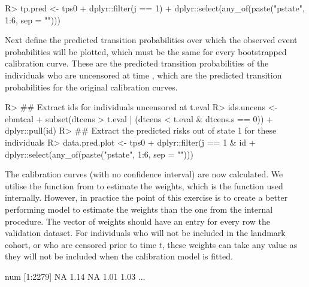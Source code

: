 \documentclass[nojss]{jss}
\begin{document}
\begin{Schunk}
\begin{Sinput}
R> tp.pred <- tps0 %
+    dplyr::filter(j == 1) %
+    dplyr::select(any_of(paste("pstate", 1:6, sep = "")))
\end{Sinput}
\end{Schunk}

Next define the predicted transition probabilities over which the observed event probabilities will be plotted, which must be the same for every bootstrapped calibration curve. These are the predicted transition probabilities of the individuals who are uncensored at time , which are the predicted transition probabilities for the original calibration curves.

\begin{Schunk}
\begin{Sinput}
R> ## Extract ids for individuals uncensored at t.eval
R> ids.uncens <- ebmtcal %
+    subset(dtcens > t.eval | (dtcens < t.eval & dtcens.s == 0)) %
+    dplyr::pull(id)
R> ## Extract the predicted risks out of state 1 for these individuals
R> data.pred.plot <- tps0 %
+    dplyr::filter(j == 1 & id %
+    dplyr::select(any_of(paste("pstate", 1:6, sep = "")))
\end{Sinput}
\end{Schunk}

The calibration curves (with no confidence interval) are now calculated. We utilise the  function from  to estimate the weights, which is the function used internally. However, in practice the point of this exercise is to create a better performing model to estimate the weights than the one from the internal procedure. The vector of weights should have an entry for every row the validation dataset. For individuals who will not be included in the landmark cohort, or who are censored prior to time $t$, these weights can take any value as they will not be included when the calibration model is fitted.

\begin{Schunk}
\begin{Soutput}
 num [1:2279] NA 1.14 NA 1.01 1.03 ...
\end{Soutput}
\end{Schunk}
\end{document}
